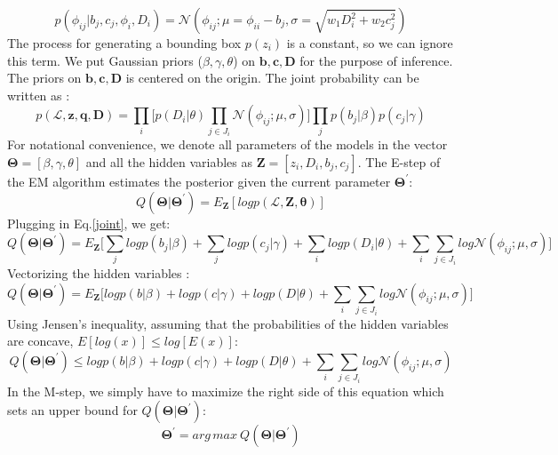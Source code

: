 \documentclass[12pt]{article}
\begin{document}
\begin{equation}
p(\phi_{ij}|b_j,c_j,\phi_i,D_i)=\mathcal{N}(\phi_{ij};\mu=\phi_{ii}-b_j, \sigma=\sqrt{w_1 D_i^2+w_2 c_j^2})
\end{equation}
The process for generating a bounding box $p(z_i)$ is a constant, so we can ignore this term. We put Gaussian priors ($\beta,\gamma,\theta$) on $\textbf{b},\textbf{c},\textbf{D}$ for the purpose of inference. The priors on $\textbf{b},\textbf{c},\textbf{D}$ is centered on the origin. The joint probability can be written as : 
\begin{equation}
p(\mathcal{L},\textbf{z},\textbf{q},\textbf{D}) = \prod_i \Big[p(D_i|\theta)\prod_{j\in J_i} \mathcal{N}(\phi_{ij};\mu, \sigma)\Big]\prod_j p(b_j|\beta) p(c_j|\gamma) 
\label{joint}
\end{equation} 
For notational convenience, we denote all parameters of the models in the vector  $\mathbf{\Theta}=[\beta ,\gamma ,\theta]$ and all the hidden variables as $\mathbf{Z}=[z_i,D_i,b_j,c_j]$. The E-step of the EM algorithm estimates the posterior given the current parameter $\mathbf{\Theta}^\prime$:
\begin{equation}
Q(\mathbf{\Theta}|\mathbf{\Theta}^\prime)=E_\mathbf{Z}[log p(\mathcal{L},\mathbf{Z},\mathbf{\theta})]
\end{equation}
Plugging in Eq.\ref{joint}, we get: 
\begin{equation}
Q(\mathbf{\Theta}|\mathbf{\Theta}^\prime)=E_\mathbf{Z}\Big[\sum_j log p(b_j|\beta)+\sum_j  log p(c_j|\gamma)+\sum_i  log p(D_i|\theta)+\sum_i\sum_{j\in J_i}log \mathcal{N}(\phi_{ij};\mu,\sigma)\Big]
\end{equation}
Vectorizing the hidden variables : 
\begin{equation}
Q(\mathbf{\Theta}|\mathbf{\Theta}^\prime)=E_\mathbf{Z}\Big[ log p(b|\beta)+  log p(c|\gamma)+  log p(D|\theta)+\sum_i\sum_{j\in J_i}log \mathcal{N}(\phi_{ij};\mu,\sigma)\Big]
\end{equation}
Using Jensen's inequality, assuming that the probabilities of the hidden variables are concave,  $E[log(x)]\leq log[E(x)]$:
\begin{equation}
Q(\mathbf{\Theta}|\mathbf{\Theta}^\prime)\leq log p(b|\beta)+  log p(c|\gamma)+  log p(D|\theta)+\sum_i\sum_{j\in J_i}log \mathcal{N}(\phi_{ij};\mu,\sigma)
\end{equation}
In the M-step, we simply have to maximize the right side of this equation which sets an upper bound for $Q(\mathbf{\Theta}|\mathbf{\Theta}^\prime)$:
\begin{equation}
\mathbf{\Theta}^\prime = arg\,max\ Q(\mathbf{\Theta}|\mathbf{\Theta}^\prime)
\end{equation}
\end{document}
